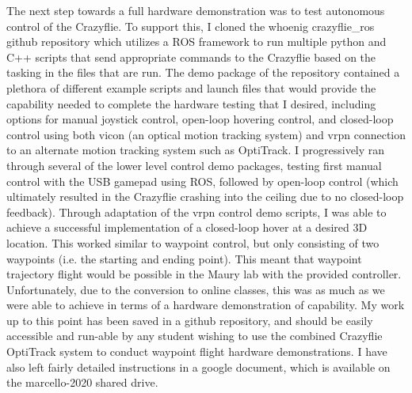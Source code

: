 \documentclass[onecolumn,10pt]{IEEEtran}
\begin{document}


The next step towards a full hardware demonstration was to test autonomous control of the Crazyflie. To support this, I cloned the whoenig crazyflie\_ros github repository which utilizes a ROS framework to run multiple python and C++ scripts that send appropriate commands to the Crazyflie based on the tasking in the files that are run. The demo package of the repository contained a plethora of different example scripts and launch files that would provide the capability needed to complete the hardware testing that I desired, including options for manual joystick control, open-loop hovering control, and closed-loop control using both vicon (an optical motion tracking system) and vrpn connection to an alternate motion tracking system such as OptiTrack. I progressively ran through several of the lower level control demo packages, testing first manual control with the USB gamepad using ROS, followed by open-loop control (which ultimately resulted in the Crazyflie crashing into the ceiling due to no closed-loop feedback). Through adaptation of the vrpn control demo scripts, I was able to achieve a successful implementation of a closed-loop hover at a desired 3D location. This worked similar to waypoint control, but only consisting of two waypoints (i.e. the starting and ending point). This meant that waypoint trajectory flight would be possible in the Maury lab with the provided controller. Unfortunately, due to the conversion to online classes, this was as much as we were able to achieve in terms of a hardware demonstration of capability. My work up to this point has been saved in a github repository, and should be easily accessible and run-able by any student wishing to use the combined Crazyflie OptiTrack system to conduct waypoint flight hardware demonstrations. I have also left fairly detailed instructions in a google document, which is available on the marcello-2020 shared drive.
\end{document}

